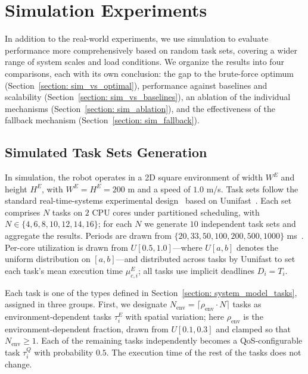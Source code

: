 \section{Simulation Experiments}
\label{section: simulation}

In addition to the real-world experiments, we use simulation to evaluate performance more comprehensively based on random task sets, 
covering a wider range of system scales and load conditions.
We organize the results into four comparisons, each with its own conclusion:
the gap to the brute-force optimum (Section~\ref{section: sim_vs_optimal}),
performance against baselines and scalability (Section~\ref{section: sim_vs_baselines}),
an ablation of the individual mechanisms (Section~\ref{section: sim_ablation}),
and the effectiveness of the fallback mechanism (Section~\ref{section: sim_fallback}).

\subsection{Simulated Task Sets Generation}
\label{section: sim_task_gen}

In simulation, the robot operates in a 2D square environment of width $W^E$ and height $H^E$,
with $W^E = H^E = 200$ m and a speed of $1.0$ m/s.
Task sets follow the standard real-time-systems experimental design~\cite{Wang2023RTAS, Zhao2020AnOF}
based on Uunifast~\cite{Davis2008EfficientES}.
Each set comprises $N$ tasks on $2$ CPU cores under partitioned scheduling,
with $N \in \{4, 6, 8, 10, 12, 14, 16\}$; for each $N$ we generate $10$ independent task sets
and aggregate the results.
Periods are drawn from $\{20, 33, 50, 100, 200, 500, 1000\}$ ms~\cite{Percept21_RTSS, Kramer15benchmark}.
Per-core utilization is drawn from $U[0.5, 1.0]$---where $U[a,b]$ denotes the uniform distribution on
$[a,b]$---and distributed across tasks by Uunifast to set each task's mean execution time
$\mu^E_{c,i}$; all tasks use implicit deadlines $D_i = T_i$.

Each task is one of the types defined in Section~\ref{section: system_model_tasks}, assigned in three groups.
First, we designate $N_{\text{env}} = \lceil \rho_{\text{env}} \cdot N \rceil$ tasks as environment-dependent
tasks $\tau^E_i$ with spatial variation; here $\rho_{\text{env}}$ is the environment-dependent fraction,
drawn from $U[0.1, 0.3]$ and clamped so that $N_{\text{env}} \ge 1$.
Each of the remaining tasks independently becomes a QoS-configurable task $\tau^Q_i$ with probability $0.5$.
The execution time of the rest of the tasks does not change.

